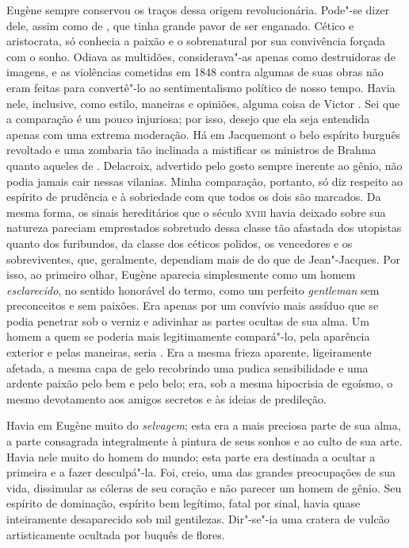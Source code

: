 Eugène  sempre conservou os traços dessa origem revolucionária.
Pode"-se dizer dele, assim como de , que tinha grande pavor
de ser enganado. Cético e aristocrata, só conhecia a paixão e o
sobrenatural por sua convivência forçada com o sonho. Odiava as
multidões, considerava"-as apenas como destruidoras de imagens, e as
violências cometidas em 1848 contra algumas de suas obras não eram
feitas para convertê"-lo ao sentimentalismo político de nosso tempo.
Havia nele, inclusive, como estilo, maneiras e opiniões, alguma coisa
de Victor . Sei que a comparação é um pouco injuriosa; por
isso, desejo que ela seja entendida apenas com uma extrema moderação.
Há em Jacquemont o belo espírito burguês revoltado e uma zombaria tão
inclinada a mistificar os ministros de Brahma quanto aqueles de . Delacroix, advertido pelo gosto sempre inerente ao gênio, não 
podia jamais cair nessas vilanias. Minha comparação, portanto, só diz
respeito ao espírito de prudência e à sobriedade com que todos os dois
são marcados. Da mesma forma, os sinais hereditários que o século \textsc{xviii}
havia deixado sobre sua natureza pareciam emprestados sobretudo dessa
classe tão afastada dos utopistas quanto dos furibundos, da classe dos
céticos polidos, os vencedores e os sobreviventes, que, geralmente,
dependiam mais de  do que de  Jean"-Jacques. Por isso, ao
primeiro olhar, Eugène  aparecia simplesmente como um homem
\textit{esclarecido}, no sentido honorável do termo, como um perfeito
\textit{gentleman} sem preconceitos e sem paixões. Era apenas por um
convívio mais assíduo que se podia penetrar sob o verniz e adivinhar as
partes ocultas de sua alma. Um homem a quem se poderia mais
legitimamente compará"-lo, pela aparência exterior e pelas maneiras,
seria . Era a mesma frieza aparente, ligeiramente afetada, a
mesma capa de gelo recobrindo uma pudica sensibilidade e uma ardente
paixão pelo bem e pelo belo; era, sob a mesma hipocrisia de egoísmo, o
mesmo devotamento aos amigos secretos e às ideias de predileção.

Havia em Eugène  muito do \textit{selvagem}; esta era a mais
preciosa parte de sua alma, a parte consagrada integralmente à pintura
de seus sonhos e ao culto de sua arte. Havia nele muito do homem do
mundo; esta parte era destinada a ocultar a primeira e a fazer
desculpá"-la. Foi, creio, uma das grandes preocupações de sua vida,
dissimular as cóleras de seu coração e não parecer um homem de gênio.
Seu espírito de dominação, espírito bem legítimo, fatal por sinal,
havia quase inteiramente desaparecido sob mil gentilezas. Dir"-se"-ia uma
cratera de vulcão artisticamente ocultada por buquês de flores.

